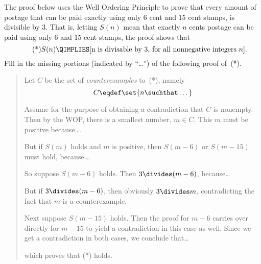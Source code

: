 \documentclass[handout]{mcs}
\begin{document}



\begin{problem}
  The proof below uses the Well Ordering Principle to prove that every
  amount of postage that can be paid exactly using only 6 cent and 15
  cent stamps, is divisible by 3.  That is, letting $S(n)$ mean that
  exactly $n$ cents postage can be paid using only 6 and 15 cent
  stamps, the proof shows that
%
\begin{equation}\tag{*}
S(n) \QIMPLIES [\text{n is divisable by 3, for all nonnegative integers $n$}].
\end{equation}
Fill in the missing portions (indicated by ``\dots'') of the following
proof of~(*).

\begin{quote}
Let $C$ be the set of \emph{counterexamples} to~(*), namely
\[
C \eqdef \set{n \suchthat \dots}
\]


Assume for the purpose of obtaining a contradiction that $C$ is
nonempty.  Then by the WOP, there is a smallest number, $m \in C$.
This $m$ must be positive because\dots.


But if $S(m)$ holds and $m$ is positive, then $S(m-6)$ or $S(m-15)$
must hold, because\dots.


So suppose $S(m-6)$ holds.  Then $3 \divides (m-6)$, because\dots


But if $3 \divides (m-6)$, then obviously $3 \divides m$,
contradicting the fact that $m$ is a counterexample.

Next suppose $S(m-15)$ holds.  Then the proof for $m-6$ carries over
directly for $m-15$ to yield a contradiction in this case as well.
Since we get a contradiction in both cases, we conclude that\dots


which proves that (*) holds.

\end{quote}
\end{problem}
\end{document}
